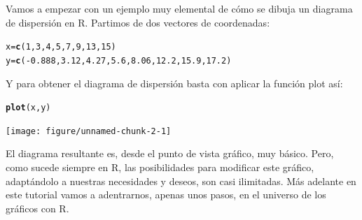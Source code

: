 \documentclass[10pt,a4paper]{article}\usepackage[]{graphicx}\usepackage[]{color}
\makeatletter
\newcommand{\hlnum}[1]{\textcolor[rgb]{0.686,0.059,0.569}{#1}}%
\newcommand{\hlopt}[1]{\textcolor[rgb]{0,0,0}{#1}}%
\newcommand{\hlstd}[1]{\textcolor[rgb]{0.345,0.345,0.345}{#1}}%
\newcommand{\hlkwb}[1]{\textcolor[rgb]{0.69,0.353,0.396}{#1}}%
\newcommand{\hlkwd}[1]{\textcolor[rgb]{0.737,0.353,0.396}{\textbf{#1}}}%
\newenvironment{kframe}{%
 \def\at@end@of@kframe{}%
 \ifinner\ifhmode%
  \def\at@end@of@kframe{\end{minipage}}%
  \begin{minipage}{\columnwidth}%
 \fi\fi%
 \def\FrameCommand##1{\hskip\@totalleftmargin \hskip-\fboxsep
 \colorbox{shadecolor}{##1}\hskip-\fboxsep
     \hskip-\linewidth \hskip-\@totalleftmargin \hskip\columnwidth}%
 \MakeFramed {\advance\hsize-\width
   \@totalleftmargin\z@ \linewidth\hsize
   \@setminipage}}%
 {\par\unskip\endMakeFramed%
 \at@end@of@kframe}
\newenvironment{knitrout}{}{} %
\makeatother
\begin{document}
Vamos a empezar con un ejemplo muy elemental de cómo se dibuja un diagrama de dispersión en R. Partimos de dos vectores de coordenadas:
\begin{knitrout}
\color{fgcolor}\begin{kframe}
\begin{alltt}
\hlstd{x} \hlkwb{=} \hlkwd{c}\hlstd{(}\hlnum{1}\hlstd{,} \hlnum{3}\hlstd{,} \hlnum{4}\hlstd{,} \hlnum{5}\hlstd{,} \hlnum{7}\hlstd{,} \hlnum{9}\hlstd{,} \hlnum{13}\hlstd{,} \hlnum{15}\hlstd{)}
\hlstd{y} \hlkwb{=} \hlkwd{c}\hlstd{(}\hlopt{-}\hlnum{0.888}\hlstd{,} \hlnum{3.12}\hlstd{,} \hlnum{4.27}\hlstd{,} \hlnum{5.6}\hlstd{,} \hlnum{8.06}\hlstd{,} \hlnum{12.2}\hlstd{,} \hlnum{15.9}\hlstd{,} \hlnum{17.2}\hlstd{)}
\end{alltt}
\end{kframe}
\end{knitrout}
Y para obtener el diagrama de dispersión basta con aplicar la función {\sf plot} así:
\begin{knitrout}
\color{fgcolor}\begin{kframe}
\begin{alltt}
\hlkwd{plot}\hlstd{(x, y)}
\end{alltt}
\end{kframe}
\texttt{[image: figure/unnamed-chunk-2-1]} 

\end{knitrout}
El diagrama resultante es, desde el punto de vista gráfico, muy básico. Pero, como sucede siempre en R, las posibilidades para modificar este gráfico, adaptándolo a nuestras necesidades y deseos, son casi ilimitadas. Más adelante en este tutorial vamos a adentrarnos, apenas unos pasos, en el universo de los gráficos con R.
\end{document}
